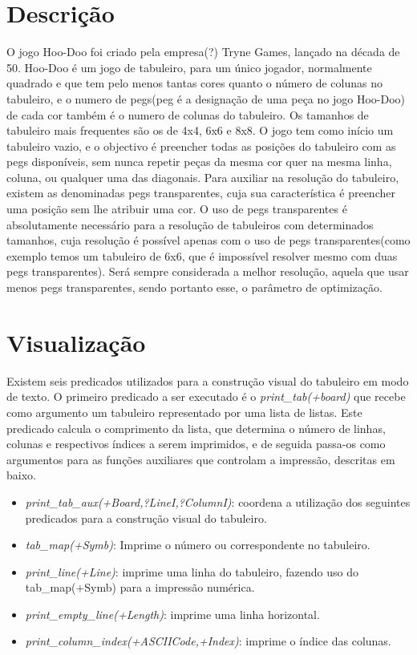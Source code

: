 \documentclass{llncs}
\begin{document}
\section{Descri\c{c}\~{a}o}
%
O jogo Hoo-Doo foi criado pela empresa(?) Tryne Games, lançado na década de 50. Hoo-Doo é um jogo de tabuleiro, para um único jogador, normalmente quadrado e que tem pelo menos tantas cores quanto o número de colunas no tabuleiro, e o numero de pegs(peg é a designação de uma peça no jogo Hoo-Doo) de cada cor também é o numero de colunas do tabuleiro. Os tamanhos de tabuleiro mais frequentes são os de 4x4, 6x6 e 8x8. O jogo tem como início um tabuleiro vazio, e o objectivo é preencher todas as posições do tabuleiro com as pegs disponíveis, sem nunca repetir peças da mesma cor quer na mesma linha, coluna, ou qualquer uma das diagonais. Para auxiliar na resolução do tabuleiro, existem as denominadas pegs transparentes, cuja sua característica é preencher uma posição sem lhe atribuir uma cor. O uso de pegs transparentes é absolutamente necessário para a resolução de tabuleiros com determinados tamanhos, cuja resolução é possível apenas com o uso de pegs transparentes(como exemplo temos um tabuleiro de 6x6, que é impossível resolver mesmo com duas pegs transparentes). Será sempre considerada a melhor resolução, aquela que usar menos pegs transparentes, sendo portanto esse, o parâmetro de optimização.





\section{Visualiza\c{c}\~{a}o}
%
Existem seis predicados utilizados para a construção visual do tabuleiro em modo de texto. O primeiro predicado a ser executado é o \textit{print\_tab(+board)} que recebe como argumento um tabuleiro representado por uma lista de listas. Este predicado calcula o comprimento da lista, que determina o número de linhas, colunas e respectivos índices a serem imprimidos, e de seguida passa-os como argumentos  para as funções auxiliares que controlam a impressão, descritas em baixo.

\begin{itemize}
\item \textit{print\_tab\_aux(+Board,?LineI,?ColumnI)}: coordena a utilização dos seguintes predicados para a construção visual do tabuleiro.
\item \textit{tab\_map(+Symb)}: Imprime o número ou correspondente no tabuleiro.
\item \textit{print\_line(+Line)}: imprime uma linha do tabuleiro, fazendo uso do tab\_map(+Symb) para a impressão numérica.
\item \textit{print\_empty\_line(+Length)}: imprime uma linha horizontal.
\item \textit{print\_column\_index(+ASCIICode,+Index)}: imprime o índice das colunas.
\end{itemize}
\end{document}
